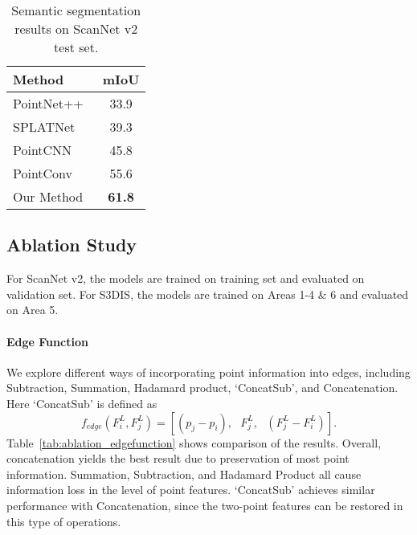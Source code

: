 \documentclass[10pt,twocolumn,letterpaper]{article}
\begin{document}
\begin{table}
	\setlength{\tabcolsep}{8pt}
	\begin{center}
		\begin{tabular}{ l | c }
\toprule[1.0pt]
			Method & mIoU  \\
			\hline
			PointNet++~\cite{pointnet2} & 33.9 \\
			SPLATNet~\cite{splatnet} & 39.3  \\
			PointCNN~\cite{pointcnn} & 45.8 \\
			PointConv~\cite{pointconv} & 55.6  \\
			\hline
			Our Method & \textbf{61.8} \\
\bottomrule[1.0pt]
		\end{tabular}
	\end{center}
	\vspace{-1mm}
	\caption{Semantic segmentation results on ScanNet v2 test set.}
	\vspace{-2mm}
	\label{tab_scannetv2}
\end{table}

\subsection{Ablation Study}
For ScanNet v2, the models are trained on training set and evaluated on validation set. For S3DIS, the models are trained on Areas 1-4 \& 6 and evaluated on Area 5.   

\vspace{-3mm}
\paragraph{Edge Function}
We explore different ways of incorporating point information into edges, including Subtraction, Summation, Hadamard product, `ConcatSub', and Concatenation. Here `ConcatSub' is defined as 
\begin{equation}
f_{edge}(F_i^{L}, F_j^{L}) =   [(p_j - p_i), \text{ } F_j^{L}, \text{ }(F_j^{L} -  F_i^{L})].
\end{equation}
Table~\ref{tab:ablation_edgefunction} shows comparison of the results.
Overall, concatenation yields the best result due to preservation of most point information.
Summation, Subtraction, and Hadamard Product all cause information loss in the level of point features. `ConcatSub' achieves similar performance with Concatenation, since the two-point features can be restored in this type of operations.
\end{document}

